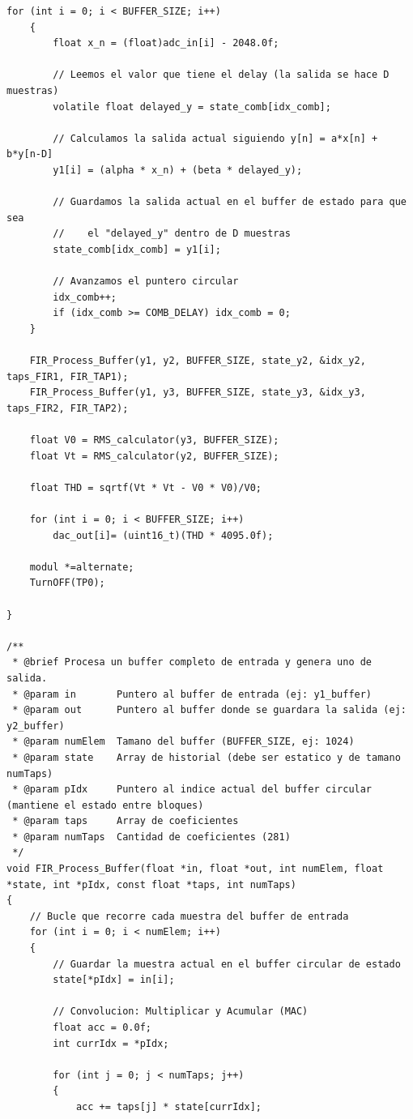\begin{lstlisting}[style=mystyle, caption=Implementación en MCU]
	for (int i = 0; i < BUFFER_SIZE; i++)
	{
	    float x_n = (float)adc_in[i] - 2048.0f;

	    // Leemos el valor que tiene el delay (la salida se hace D muestras)
	    volatile float delayed_y = state_comb[idx_comb];

	    // Calculamos la salida actual siguiendo y[n] = a*x[n] + b*y[n-D]
	    y1[i] = (alpha * x_n) + (beta * delayed_y);

	    // Guardamos la salida actual en el buffer de estado para que sea
	    //    el "delayed_y" dentro de D muestras
	    state_comb[idx_comb] = y1[i];

	    // Avanzamos el puntero circular
	    idx_comb++;
	    if (idx_comb >= COMB_DELAY) idx_comb = 0;
	}

	FIR_Process_Buffer(y1, y2, BUFFER_SIZE, state_y2, &idx_y2, taps_FIR1, FIR_TAP1);
	FIR_Process_Buffer(y1, y3, BUFFER_SIZE, state_y3, &idx_y3, taps_FIR2, FIR_TAP2);

	float V0 = RMS_calculator(y3, BUFFER_SIZE);
	float Vt = RMS_calculator(y2, BUFFER_SIZE);

	float THD = sqrtf(Vt * Vt - V0 * V0)/V0;

	for (int i = 0; i < BUFFER_SIZE; i++)
		dac_out[i]= (uint16_t)(THD * 4095.0f);

	modul *=alternate;
	TurnOFF(TP0);

}

/**
 * @brief Procesa un buffer completo de entrada y genera uno de salida.
 * @param in       Puntero al buffer de entrada (ej: y1_buffer)
 * @param out      Puntero al buffer donde se guardara la salida (ej: y2_buffer)
 * @param numElem  Tamano del buffer (BUFFER_SIZE, ej: 1024)
 * @param state    Array de historial (debe ser estatico y de tamano numTaps)
 * @param pIdx     Puntero al indice actual del buffer circular (mantiene el estado entre bloques)
 * @param taps     Array de coeficientes
 * @param numTaps  Cantidad de coeficientes (281)
 */
void FIR_Process_Buffer(float *in, float *out, int numElem, float *state, int *pIdx, const float *taps, int numTaps)
{
    // Bucle que recorre cada muestra del buffer de entrada
    for (int i = 0; i < numElem; i++)
    {
        // Guardar la muestra actual en el buffer circular de estado
        state[*pIdx] = in[i];

        // Convolucion: Multiplicar y Acumular (MAC)
        float acc = 0.0f;
        int currIdx = *pIdx;

        for (int j = 0; j < numTaps; j++)
        {
            acc += taps[j] * state[currIdx];


\end{lstlisting}

